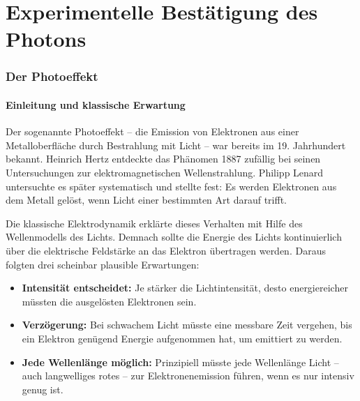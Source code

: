 \chapter{Experimentelle Bestätigung des Photons}
\setcounter{section}{4}
\setcounter{subsection}{0}
\setcounter{subsubsection}{1}
\setcounter{secnumdepth}{3}
\setlength{\parindent}{0pt}
\subsection{Der Photoeffekt }

\subsubsection{Einleitung und klassische Erwartung}

Der sogenannte Photoeffekt – die Emission von Elektronen aus einer Metalloberfläche durch Bestrahlung mit Licht – war bereits im 19. Jahrhundert bekannt. Heinrich Hertz entdeckte das Phänomen 1887 zufällig bei seinen Untersuchungen zur elektromagnetischen Wellenstrahlung. Philipp Lenard untersuchte es später systematisch und stellte fest: Es werden Elektronen aus dem Metall gelöst, wenn Licht einer bestimmten Art darauf trifft.

Die klassische Elektrodynamik erklärte dieses Verhalten mit Hilfe des Wellenmodells des Lichts. Demnach sollte die Energie des Lichts kontinuierlich über die elektrische Feldstärke an das Elektron übertragen werden. Daraus folgten drei scheinbar plausible Erwartungen:

\begin{itemize}
	\item \textbf{Intensität entscheidet:} Je stärker die Lichtintensität, desto energiereicher müssten die ausgelösten Elektronen sein.
	\item \textbf{Verzögerung:} Bei schwachem Licht müsste eine messbare Zeit vergehen, bis ein Elektron genügend Energie aufgenommen hat, um emittiert zu werden.
	\item \textbf{Jede Wellenlänge möglich:} Prinzipiell müsste jede Wellenlänge Licht – auch langwelliges rotes – zur Elektronenemission führen, wenn es nur intensiv genug ist.
\end{itemize}

